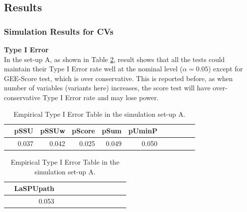 \documentclass[12pt]{article}
\begin{document}
\subsection{Results}
\subsubsection{Simulation Results for CVs}
\textbf{Type I Error}\\
In the set-up A, as shown in Table \ref{table:CV_typeIerror_pathway}, result shows that all the tests could maintain their Type I Error rate well at the nominal level ($\alpha = 0.05$) except for GEE-Score test, which is over conservative. This is reported before, as when number of variables (variants here) increases, the score test will have over-conservative Type I Error rate and may lose power.



\begin{table}[ht]
\centering
\begin{tabular}{rrrrrrrrrrr}
  \hline
 & pSSU & pSSUw & pScore & pSum & pUminP \\
  \hline
 & 0.037  & 0.042 & 0.025 & 0.049 & 0.050& \\
   \hline
\end{tabular}
\begin{tabular}{rrrrrrrrrrrr}
  \hline
 & LaSPUpath \\
  \hline
 & 0.053 \\
   \hline
\end{tabular}
\caption{Empirical Type I Error Table in the simulation set-up A.}
\label{table:CV_typeIerror_pathway}
\end{table}
\end{document}
